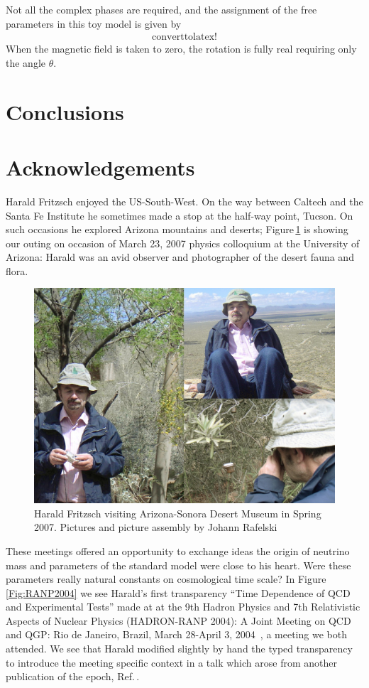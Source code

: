 \documentclass[addchapnum]{ws-rv961x669} %
\begin{document}
Not all the complex phases are required, and the assignment of the free parameters in this toy model is given by
\begin{align}
    \label{eigenvalue:2}
    \mathrm{convert to latex!}
\end{align}
When the magnetic field is taken to zero, the rotation is fully real requiring only the angle $\theta$.
\section{Conclusions}


\section*{Acknowledgements}
Harald Fritzsch enjoyed the US-South-West. On the way between Caltech and the Santa Fe Institute he sometimes made a stop at the half-way point, Tucson. On such occasions he explored Arizona mountains and  deserts; Figure\,\ref{Fig:AZcolloq2007} is showing our outing on occasion of March 23, 2007 physics colloquium at the University of Arizona: Harald was an avid observer and photographer of the desert fauna and flora. 
 
\begin{figure}%
\centerline{\includegraphics[width=0.95\columnwidth]{07March24HaraldCollageDesertMuseum.jpg}}
\caption{Harald Fritzsch visiting Arizona-Sonora Desert Museum in Spring 2007. Pictures and picture assembly by Johann Rafelski
}
\label{Fig:AZcolloq2007} 
\end{figure}

These meetings offered an opportunity to exchange ideas the  origin of neutrino mass and parameters of  the standard model were close to his heart. Were these parameters really natural constants on cosmological time scale? In Figure\,\ref{Fig:RANP2004} we see Harald's first transparency ``Time Dependence of QCD and Experimental Tests'' made at at the 9th Hadron Physics and 7th Relativistic Aspects of Nuclear Physics (HADRON-RANP 2004): A Joint Meeting on QCD and QGP: Rio de Janeiro, Brazil, March 28-April 3, 2004~\cite{Fritzsch:2004civ}, a meeting we both attended. We see that Harald modified slightly by hand the typed transparency to introduce the meeting specific context in a talk which arose from another publication of the epoch, Ref.\,\cite{Calmet:2001nu}. 
\end{document}

